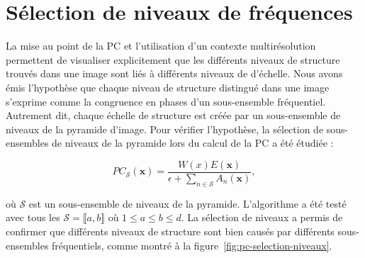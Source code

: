 \section{Sélection de niveaux de fréquences}

La mise au point de la PC et l'utilisation d'un contexte multirésolution permettent de visualiser explicitement que les différents niveaux de structure trouvés dans une image sont liés à différents niveaux de d'échelle. Nous avons émis l'hypothèse que chaque niveau de structure distingué dans une image s'exprime comme la congruence en phases d'un sous-ensemble fréquentiel. Autrement dit, chaque échelle de structure est créée par un sous-ensemble de niveaux de la pyramide d'image. Pour vérifier l'hypothèse, la sélection de sous-ensembles de niveaux de la pyramide lors du calcul de la PC a été étudiée :

\begin{equation}
    PC_{\mathcal{S}}(\mathbf{x}) = \frac{W(x)E(\mathbf{x})}{\epsilon + \sum_{n\in\mathcal{S}} A_{n}(\mathbf{x})},
\end{equation}

\noindent où $\mathcal{S}$ est un sous-ensemble de niveaux de la pyramide. L'algorithme a été testé avec tous les $\mathcal{S} = \llbracket a, b\rrbracket$ où $1 \leq a \leq b \leq d$. La sélection de niveaux a permis de confirmer que différents niveaux de structure sont bien causés par différents sous-ensembles fréquentiels, comme montré à la figure~\ref{fig:pc-selection-niveaux}.

\bigskip

